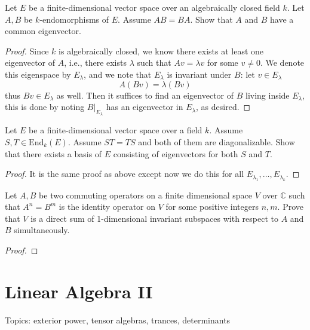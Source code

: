 \begin{prob}[S2009-Q4]
    Let \(E\) be a finite-dimensional vector space over an algebraically closed field \(k\). Let \(A, B\) be \(k\)-endomorphisms of \(E\). Assume \(AB = BA\). Show that \(A\) and \(B\) have a common eigenvector.
\end{prob}
\begin{proof}
    Since $k$ is algebraically closed, we know there exists at least one eigenvector of $A$, i.e., there exists $\lambda$ such that $Av=\lambda v$ for some $v\neq 0$. We denote this eigenspace by $E_\lambda$, and we note that $E_\lambda$ is invariant under $B$: let $v\in E_\lambda$
    \begin{equation*}
        A(Bv)=\lambda(Bv)
    \end{equation*}
    thus $Bv\in E_\lambda$ as well. Then it suffices to find an eigenvector of $B$ living inside $E_\lambda$, this is done by noting $B\vert_{E_\lambda}$ has an eigenvector in $E_\lambda$, as desired.
\end{proof}


\begin{prob}[F2005-Q6]
    Let \(E\) be a finite-dimensional vector space over a field \(k\). Assume \(S, T \in \text{End}_k(E)\). Assume \(ST = TS\) and both of them are diagonalizable. Show that there exists a basis of \(E\) consisting of eigenvectors for both \(S\) and \(T\).
\end{prob}
\begin{proof}
    It is the same proof as above except now we do this for all $E_{\lambda_1},\dots, E_{\lambda_k}$.
\end{proof}

\begin{prob}[S2015-Q2]
    Let \(A,B\) be two commuting operators on a finite dimensional space \(V\) over \(\mathbb{C}\) such that \(A^{n}=B^{m}\) is the identity operator on \(V\) for some positive integers \(n,m\). Prove that \(V\) is a direct sum of 1-dimensional invariant subspaces with respect to \(A\) and \(B\) simultaneously.
\end{prob}
\begin{proof}
    
\end{proof}






\chapter{Linear Algebra II}
Topics: exterior power, tensor algebras, trances, determinants

